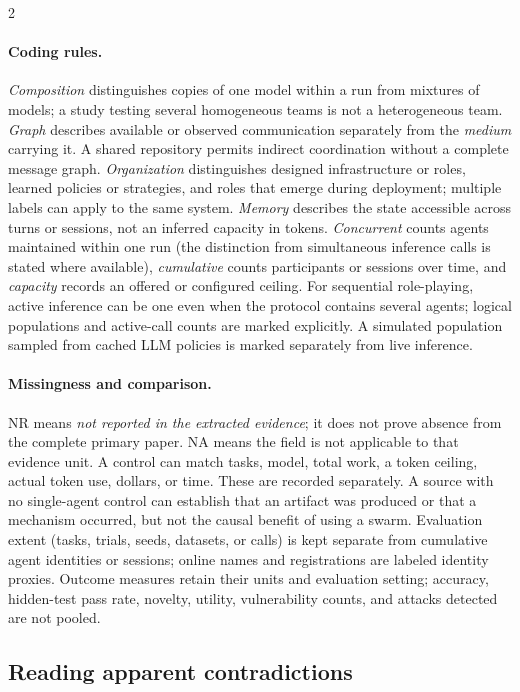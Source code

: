 \begin{multicols}{2}
\paragraph{Coding rules.}
\emph{Composition} distinguishes copies of one model within a run from mixtures of models; a study testing several homogeneous teams is not a heterogeneous team. \emph{Graph} describes available or observed communication separately from the \emph{medium} carrying it. A shared repository permits indirect coordination without a complete message graph. \emph{Organization} distinguishes designed infrastructure or roles, learned policies or strategies, and roles that emerge during deployment; multiple labels can apply to the same system. \emph{Memory} describes the state accessible across turns or sessions, not an inferred capacity in tokens. \emph{Concurrent} counts agents maintained within one run (the distinction from simultaneous inference calls is stated where available), \emph{cumulative} counts participants or sessions over time, and \emph{capacity} records an offered or configured ceiling. For sequential role-playing, active inference can be one even when the protocol contains several agents; logical populations and active-call counts are marked explicitly. A simulated population sampled from cached LLM policies is marked separately from live inference.

\paragraph{Missingness and comparison.}
NR means \emph{not reported in the extracted evidence}; it does not prove absence from the complete primary paper. NA means the field is not applicable to that evidence unit. A control can match tasks, model, total work, a token ceiling, actual token use, dollars, or time. These are recorded separately. A source with no single-agent control can establish that an artifact was produced or that a mechanism occurred, but not the causal benefit of using a swarm. Evaluation extent (tasks, trials, seeds, datasets, or calls) is kept separate from cumulative agent identities or sessions; online names and registrations are labeled identity proxies. Outcome measures retain their units and evaluation setting; accuracy, hidden-test pass rate, novelty, utility, vulnerability counts, and attacks detected are not pooled.

\subsection{Reading apparent contradictions}
\label{app:contradictions}


\end{multicols}
